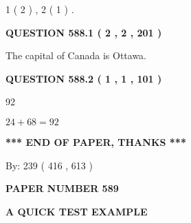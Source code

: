 \documentclass[12pt]{article}
\begin{document}
   
   1 ( 2 )
 ,
   2 ( 1 )
 .
  
\vspace{0.2in}
  
{\textbf{\Large{QUESTION
588.1 
 ( 2 , 2 , 201 )
}}}
  
  
 
 
\noindent{}
 
 
The capital of Canada is Ottawa.
 
 
 
 
  
\vspace{0.2in}
  
{\textbf{\Large{QUESTION
588.2 
 ( 1 , 1 , 101 )
}}}
  
  
 
 
\noindent{}

92
 
 
 
 
\noindent{}

$ %
24 +  %
68=   %
92$
 
 
   
   
 \vspace{0.2in}
 
   
   
   
   
\vspace{1.0in} 
{\textbf{\large{ *** END OF PAPER, THANKS *** }}} 
   
   
\hspace{1.0in} By: 
 239 ( 416 ,  613 )
   
   
   
   
\newpage 
\setcounter{page}{ 
   589001 } 
   
   
   
   
 {\textbf{ \Large{ PAPER NUMBER  589  }}}
   
   
\vspace{0.2in}
   
   
   
   
   
   
 \vspace{0.2in}
{\LARGE {\textbf{ A QUICK TEST EXAMPLE}}}
   
\end{document}
